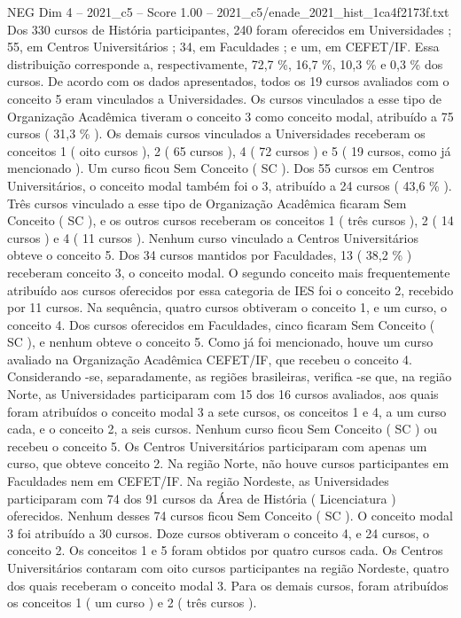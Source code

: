\begin{textsample}{NEG Dim 4 – 2021\_c5 – Score 1.00 – 2021\_c5/enade\_2021\_hist\_1ca4f2173f.txt}
Dos 330 cursos de História participantes, 240 foram oferecidos em Universidades ; 55, em Centros Universitários ; 34, em Faculdades ; e um, em CEFET/IF.
Essa distribuição corresponde a, respectivamente, 72,7 \%, 16,7 \%, 10,3 \% e 0,3 \% dos cursos.
De acordo com os dados apresentados, todos os 19 cursos avaliados com o conceito 5 eram vinculados a Universidades.
Os cursos vinculados a esse tipo de Organização Acadêmica tiveram o conceito 3 como conceito modal, atribuído a 75 cursos ( 31,3 \% ).
Os demais cursos vinculados a Universidades receberam os conceitos 1 ( oito cursos ), 2 ( 65 cursos ), 4 ( 72 cursos ) e 5 ( 19 cursos, como já mencionado ).
Um curso ficou Sem Conceito ( SC ).
Dos 55 cursos em Centros Universitários, o conceito modal também foi o 3, atribuído a 24 cursos ( 43,6 \% ).
Três cursos vinculado a esse tipo de Organização Acadêmica ficaram Sem Conceito ( SC ), e os outros cursos receberam os conceitos 1 ( três cursos ), 2 ( 14 cursos ) e 4 ( 11 cursos ).
Nenhum curso vinculado a Centros Universitários obteve o conceito 5.
Dos 34 cursos mantidos por Faculdades, 13 ( 38,2 \% ) receberam conceito 3, o conceito modal.
O segundo conceito mais frequentemente atribuído aos cursos oferecidos por essa categoria de IES foi o conceito 2, recebido por 11 cursos.
Na sequência, quatro cursos obtiveram o conceito 1, e um curso, o conceito 4.
Dos cursos oferecidos em Faculdades, cinco ficaram Sem Conceito ( SC ), e nenhum obteve o conceito 5.
Como já foi mencionado, houve um curso avaliado na Organização Acadêmica CEFET/IF, que recebeu o conceito 4.
Considerando -se, separadamente, as regiões brasileiras, verifica -se que, na região Norte, as Universidades participaram com 15 dos 16 cursos avaliados, aos quais foram atribuídos o conceito modal 3 a sete cursos, os conceitos 1 e 4, a um curso cada, e o conceito 2, a seis cursos.
Nenhum curso ficou Sem Conceito ( SC ) ou recebeu o conceito 5.
Os Centros Universitários participaram com apenas um curso, que obteve conceito 2.
Na região Norte, não houve cursos participantes em Faculdades nem em CEFET/IF.
Na região Nordeste, as Universidades participaram com 74 dos 91 cursos da Área de História ( Licenciatura ) oferecidos.
Nenhum desses 74 cursos ficou Sem Conceito ( SC ).
O conceito modal 3 foi atribuído a 30 cursos.
Doze cursos obtiveram o conceito 4, e 24 cursos, o conceito 2.
Os conceitos 1 e 5 foram obtidos por quatro cursos cada.
Os Centros Universitários contaram com oito cursos participantes na região Nordeste, quatro dos quais receberam o conceito modal 3.
Para os demais cursos, foram atribuídos os conceitos 1 ( um curso ) e 2 ( três cursos ).

\end{textsample}
